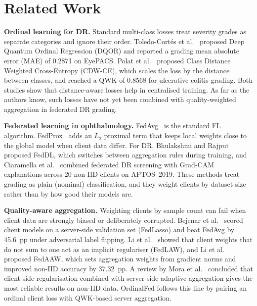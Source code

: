 \section{Related Work}
\label{sec:related}

\textbf{Ordinal learning for DR.}
Standard multi-class losses treat severity grades as separate categories and ignore
their order. Toledo-Cort\'{e}s et al.~\cite{toledocortes2022dqor} proposed Deep
Quantum Ordinal Regression (DQOR) and reported a grading mean absolute error (MAE)
of 0.2871 on EyePACS. Polat et al.~\cite{polat2024cdwce} proposed Class Distance
Weighted Cross-Entropy (CDW-CE), which scales the loss by the distance between
classes, and reached a QWK of 0.8568 for ulcerative colitis grading. Both studies
show that distance-aware losses help in centralised training. As far as the
authors know, such losses have not yet been combined with quality-weighted
aggregation in federated DR grading.

\textbf{Federated learning in ophthalmology.}
FedAvg~\cite{mcmahan2017fedavg} is the standard FL algorithm.
FedProx~\cite{li2020fedprox} adds an $L_2$ proximal term that keeps local weights
close to the global model when client data differ. For DR, Bhulakshmi and
Rajput~\cite{bhulakshmi2024feddl} proposed FedDL, which switches between
aggregation rules during training, and Ciaramella et al.~\cite{ciaramella2025fl}
combined federated DR screening with Grad-CAM explanations across 20 non-IID
clients on APTOS~2019. These methods treat grading as plain (nominal)
classification, and they weight clients by dataset size rather than by how good
their models are.

\textbf{Quality-aware aggregation.}
Weighting clients by sample count can fail when client data are strongly biased or
deliberately corrupted. Bejenar et al.~\cite{bejenar2023aggregation} scored client
models on a server-side validation set (FedLasso) and beat FedAvg by 45.6~pp under
adversarial label flipping. Li et al.~\cite{li2023revisiting} showed that client
weights that do not sum to one act as an implicit regulariser (FedLAW), and Li et
al.~\cite{li2025fedaaw} proposed FedAAW, which sets aggregation weights from
gradient norms and improved non-IID accuracy by 37.32~pp. A review by Mora et
al.~\cite{mora2024review} concluded that client-side regularisation combined with
server-side adaptive aggregation gives the most reliable results on non-IID data.
OrdinalFed follows this line by pairing an ordinal client loss with QWK-based
server aggregation.

